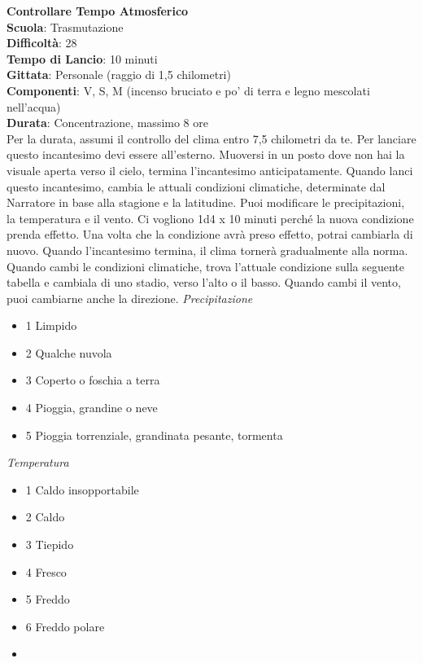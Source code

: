 \begin{multicols}{2}
\medskip\textbf{Controllare Tempo Atmosferico}\\
\textbf{Scuola}: Trasmutazione\\
\textbf{Difficoltà}:  28\\
\textbf{Tempo di Lancio}: 10 minuti\\
\textbf{Gittata}: Personale (raggio di 1,5 chilometri)\\
\textbf{Componenti}: V, S, M (incenso bruciato e po’ di terra e legno mescolati nell'acqua)\\
\textbf{Durata}: Concentrazione, massimo 8 ore \\
Per la durata, assumi il controllo del clima entro 7,5 chilometri da te. Per lanciare questo incantesimo devi essere all'esterno. Muoversi in un posto dove non hai la visuale aperta verso il cielo, termina l'incantesimo anticipatamente. Quando lanci questo incantesimo, cambia le attuali condizioni climatiche, determinate dal Narratore in base alla stagione e la latitudine. Puoi modificare le precipitazioni, la temperatura e il vento. Ci vogliono 1d4 x 10 minuti perché la nuova condizione prenda effetto. Una volta che la condizione avrà preso effetto, potrai cambiarla di nuovo. Quando l'incantesimo termina, il clima tornerà gradualmente alla norma.\\
Quando cambi le condizioni climatiche, trova l’attuale condizione sulla seguente tabella e cambiala di uno stadio, verso l’alto o il basso. Quando cambi il vento, puoi cambiarne anche la direzione. 
\medskip
\textit{Precipitazione}
\begin{itemize}
	\item 
1 Limpido
	\item 
2 Qualche nuvola
	\item 
3 Coperto o foschia a terra
	\item 
4 Pioggia, grandine o neve
	\item 
5 Pioggia torrenziale, grandinata pesante, tormenta
\end{itemize}

\textit{Temperatura}

\begin{itemize}
 \item 
1 Caldo insopportabile
	\item 
2 Caldo
	\item 
3 Tiepido
	\item 
4 Fresco
	\item 
5 Freddo
	\item 
6 Freddo polare
	\item 
\end{itemize}


\end{multicols}
